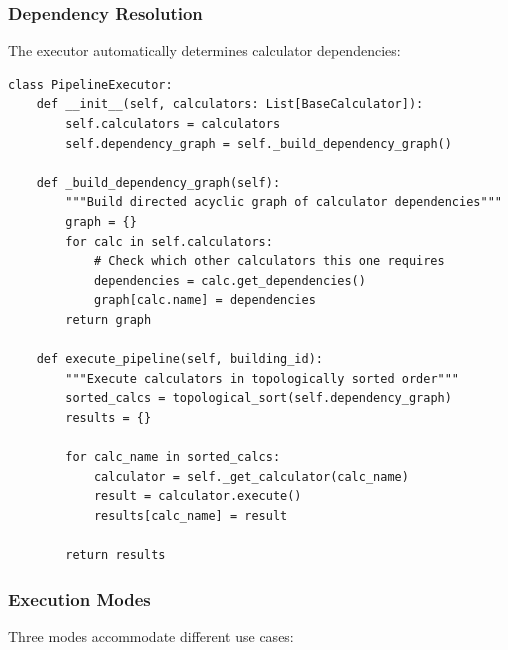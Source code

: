 \subsubsection{Dependency Resolution}

The executor automatically determines calculator dependencies:

\begin{lstlisting}[style=pythonstyle, caption=Automatic dependency resolution]
class PipelineExecutor:
    def __init__(self, calculators: List[BaseCalculator]):
        self.calculators = calculators
        self.dependency_graph = self._build_dependency_graph()
    
    def _build_dependency_graph(self):
        """Build directed acyclic graph of calculator dependencies"""
        graph = {}
        for calc in self.calculators:
            # Check which other calculators this one requires
            dependencies = calc.get_dependencies()
            graph[calc.name] = dependencies
        return graph
    
    def execute_pipeline(self, building_id):
        """Execute calculators in topologically sorted order"""
        sorted_calcs = topological_sort(self.dependency_graph)
        results = {}
        
        for calc_name in sorted_calcs:
            calculator = self._get_calculator(calc_name)
            result = calculator.execute()
            results[calc_name] = result
        
        return results
\end{lstlisting}

\subsubsection{Execution Modes}

Three modes accommodate different use cases:

